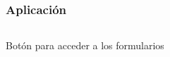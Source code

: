 \documentclass[14pt]{beamer}
\begin{document}
\begin{frame}
\frametitle{Aplicación}

\begin{columns}

\begin{column}{0.3\textwidth}
\begin{center}

\begin{small}
\caption{Botón para acceder a los formularios}
\end{small}
\end{center}
\end{column}


\begin{column}{0.3\textwidth}
\begin{center}


\end{center}
\end{column}
\end{columns}
\end{frame}
\end{document}

